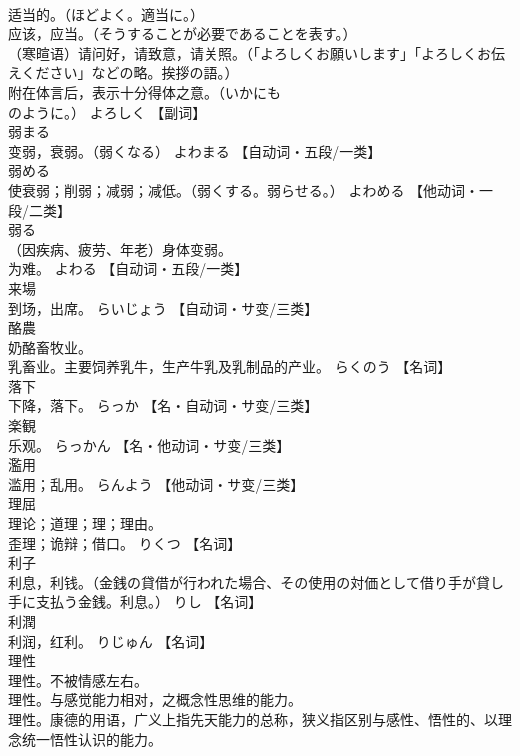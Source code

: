 \documentclass[8pt]{extreport}
\begin{document}
\begin{CJK}{UTF8}{min}
\\	适当的。（ほどよく。適当に。） 
\\	应该，应当。（そうすることが必要であることを表す。） 
\\	（寒暄语）请问好，请致意，请关照。（「よろしくお願いします」「よろしくお伝えください」などの略。挨拶の語。） 
\\	附在体言后，表示十分得体之意。（いかにも
\\	のように。）	よろしく		【副词】
\\	弱まる	
\\	变弱，衰弱。（弱くなる）	よわまる		【自动词・五段/一类】
\\	弱める	
\\	使衰弱；削弱；减弱；减低。（弱くする。弱らせる。）	よわめる		【他动词・一段/二类】
\\	弱る	
\\	（因疾病、疲劳、年老）身体变弱。 
\\	为难。	よわる		【自动词・五段/一类】
\\	来場	
\\	到场，出席。	らいじょう		【自动词・サ变/三类】
\\	酪農	
\\	奶酪畜牧业。 
\\	乳畜业。主要饲养乳牛，生产牛乳及乳制品的产业。	らくのう		【名词】
\\	落下	
\\	下降，落下。	らっか		【名・自动词・サ变/三类】
\\	楽観	
\\	乐观。	らっかん		【名・他动词・サ变/三类】
\\	濫用	
\\	滥用；乱用。	らんよう		【他动词・サ变/三类】
\\	理屈	
\\	理论；道理；理；理由。 
\\	歪理；诡辩；借口。	りくつ		【名词】
\\	利子	
\\	利息，利钱。（金銭の貸借が行われた場合、その使用の対価として借り手が貸し手に支払う金銭。利息。）	りし		【名词】
\\	利潤	
\\	利润，红利。	りじゅん		【名词】
\\	理性	
\\	理性。不被情感左右。 
\\	理性。与感觉能力相对，之概念性思维的能力。 
\\	理性。康德的用语，广义上指先天能力的总称，狭义指区别与感性、悟性的、以理念统一悟性认识的能力。 

\end{CJK}
\end{document}
